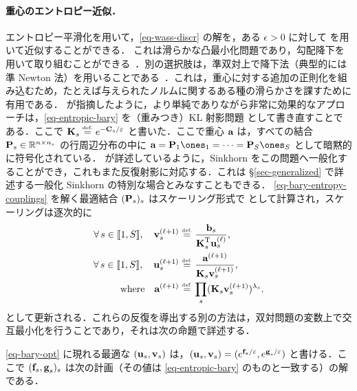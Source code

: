 \paragraph{重心のエントロピー近似．}

エントロピー平滑化を用いて，\eqref{eq-wass-discr} の解を，ある $\epsilon>0$ に対して
を用いて近似することができる．
%
これは滑らかな凸最小化問題であり，勾配降下を用いて取り組むことができる~\citep{CuturiBarycenter,GramfortPC15}．別の選択肢は，準双対上で降下法（典型的には準 Newton 法）を用いることである~\citep{2016-Cuturi-siims}．これは，重心に対する追加の正則化を組み込むため，たとえば与えられたノルムに関するある種の滑らかさを課すために有用である．
%
\citet{2015-benamou-cisc} が指摘したように，より単純でありながら非常に効果的なアプローチは，\eqref{eq-entropic-bary} を（重みつき）KL 射影問題
として書き直すことである．ここで $\K_s \eqdef e^{-\C_s/\epsilon}$ と書いた．ここで重心 $\a$ は，すべての結合 $\P_s \in \RR^{n \times n_s}$ の行周辺分布の中に $\a = \P_1\ones_1 =  \cdots = \P_S\ones_S$ として暗黙的に符号化されている．
%
\citet{2015-benamou-cisc} が詳述しているように，Sinkhorn をこの問題へ一般化することができ，これもまた反復射影に対応する．これは \S\ref{sec-generalized} で詳述する一般化 Sinkhorn の特別な場合とみなすこともできる．
%
\eqref{eq-bary-entropy-couplings} を解く最適結合 $(\P_s)_s$ はスケーリング形式で
として計算され，スケーリングは逐次的に
\begin{align}\label{eq-sinkhorn-bary}
	\foralls s \in \range{1,S}, \quad \itt{\vD}_s &\eqdef \frac{\b_s}{\transp{\K}_s \it{\uD}_s}, \\
	\foralls s \in \range{1,S}, \quad  \itt{\uD}_s &\eqdef \frac{\itt{\a}}{\K_s \itt{\vD}_s}, \label{eq-sinkhorn-bary-2}\\
		\qwhereq
		\itt{\a} &\eqdef \prod_s (  \K_s \itt{\vD}_s )^{\la_s}. \label{eq-sinkhorn-bary-3}
\end{align}
として更新される．これらの反復を導出する別の方法は，双対問題の変数上で交互最小化を行うことであり，それは次の命題で詳述する．

\begin{prop}
	\eqref{eq-bary-opt} に現れる最適な $(\uD_s,\vD_s)$ は，$(\uD_s,\vD_s) = ( e^{\fD_s/\epsilon},e^{\gD_s/\epsilon} )$ と書ける．ここで $( \fD_s,\gD_s )_s$ は次の計画（その値は \eqref{eq-entropic-bary} のものと一致する）の解である．
\end{prop}

